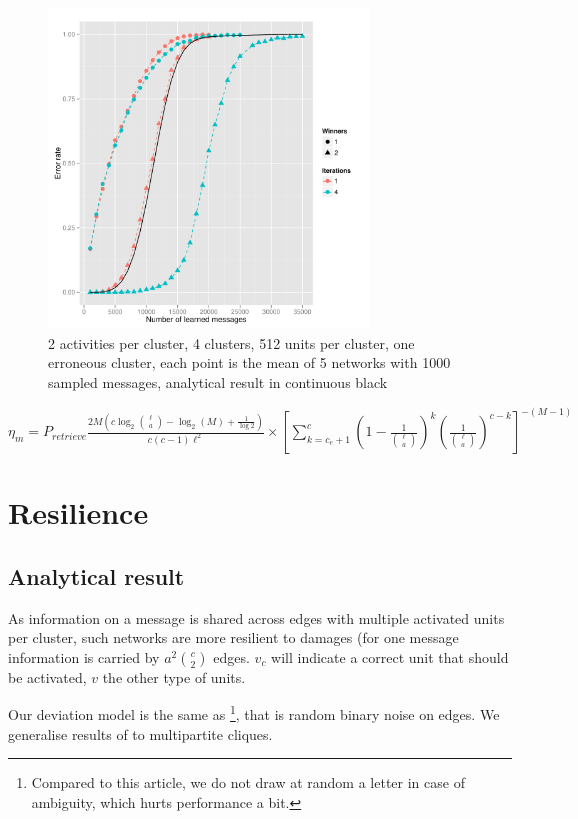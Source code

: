\documentclass[english,10pt,twocolumn]{IEEEtran}
\theoremstyle{definition}
\begin{document}
	\begin{figure}[!htb]
		\includegraphics[width=8.5cm]{Courbes/remplacement_figure3g1}
		\caption{2 activities per cluster, 4 clusters, 512 units per cluster, one erroneous cluster, each point is the mean of 5 networks with 1000 sampled messages, analytical result in continuous black}
		\label{corruptth}
	\end{figure}
		
		$\eta_m = P_{retrieve}  \frac{2 M\left(c \log_2{\ell \choose a } - \log_2(M) + \frac{1}{\log 2} \right)}{c(c-1)\ell^2} \times \left [\sum_{k = c_e+1}^{c} \left (1-\frac{1}{{\ell \choose a}} \right )^k \left (\frac{1}{{\ell \choose a}} \right )^{c-k} \right ] ^{-(M-1)}$
		
		

	
	\section{Resilience}
	\subsection{Analytical result}
	
	As information on a message is shared across edges with multiple activated units per cluster, such networks are more resilient to damages (for one message information is carried by $a^2 {c \choose 2}$ edges. $v_c$ will indicate a correct unit that should be activated, $v$ the other type of units.
	
	Our deviation model is the same as \cite{LedGriRabGro20145}\footnote{Compared to this article, we do not draw at random a letter in case of ambiguity, which hurts performance a bit.}, that is random binary noise on edges. We generalise results of \cite{LedGriRabGro20145} to multipartite cliques.
	
\end{document}
